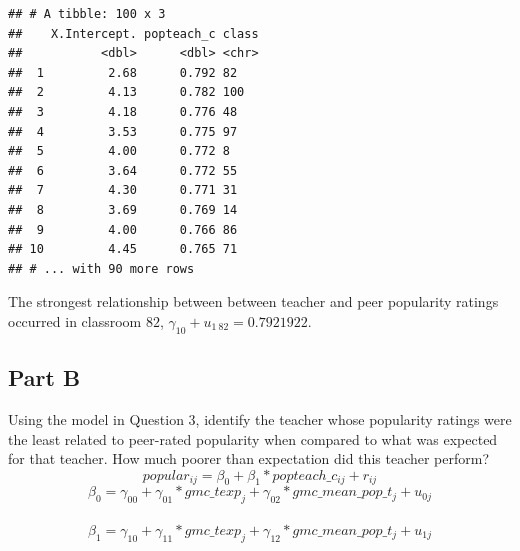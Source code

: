 \documentclass[]{article}
\newenvironment{Shaded}{\begin{snugshade}}{\end{snugshade}}
\newcommand{\KeywordTok}[1]{\textcolor[rgb]{0.13,0.29,0.53}{\textbf{#1}}}
\newcommand{\DataTypeTok}[1]{\textcolor[rgb]{0.13,0.29,0.53}{#1}}
\newcommand{\DecValTok}[1]{\textcolor[rgb]{0.00,0.00,0.81}{#1}}
\newcommand{\StringTok}[1]{\textcolor[rgb]{0.31,0.60,0.02}{#1}}
\newcommand{\OperatorTok}[1]{\textcolor[rgb]{0.81,0.36,0.00}{\textbf{#1}}}
\newcommand{\NormalTok}[1]{#1}
\begin{document}
\begin{Shaded}
\end{Shaded}

\begin{verbatim}
## # A tibble: 100 x 3
##    X.Intercept. popteach_c class
##           <dbl>      <dbl> <chr>
##  1         2.68      0.792 82   
##  2         4.13      0.782 100  
##  3         4.18      0.776 48   
##  4         3.53      0.775 97   
##  5         4.00      0.772 8    
##  6         3.64      0.772 55   
##  7         4.30      0.771 31   
##  8         3.69      0.769 14   
##  9         4.00      0.766 86   
## 10         4.45      0.765 71   
## # ... with 90 more rows
\end{verbatim}

The strongest relationship between between teacher and peer popularity
ratings occurred in classroom \(82\),
\(\gamma_{10} + u_{1~82} = 0.7921922\).

\subsection{Part B}\label{part-b-4}

Using the model in Question 3, identify the teacher whose popularity
ratings were the least related to peer-rated popularity when compared to
what was expected for that teacher. How much poorer than expectation did
this teacher perform?\\
\[popular_{ij} = \beta_{0} + \beta_1 * popteach\_c_{ij} + r_{ij}\]
\[\beta_0 = \gamma_{00} + \gamma_{01}*gmc\_texp_j + \gamma_{02}*gmc\_mean\_pop\_t_j + u_{0j}\]\\
\[\beta_1 = \gamma_{10} + \gamma_{11}*gmc\_texp_j + \gamma_{12}*gmc\_mean\_pop\_t_j + u_{1j}\]

\begin{Shaded}
\end{Shaded}
\end{document}
